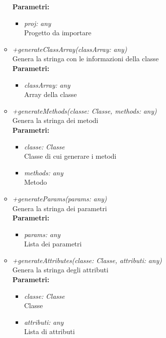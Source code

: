 \begin{itemize}
\begin{itemize}
    		\textbf{Parametri:}
    		\begin{itemize}
    			\item \emph{proj: any}\\
    			Progetto da importare
    		\end{itemize}
    		\item \emph{+generateClassArray(classArray: any)}\\
    		Genera la stringa con le informazioni della classe\\
    		\textbf{Parametri:}
    		\begin{itemize}
    			\item \emph{classArray: any}\\
    			Array della classe
    		\end{itemize}
    		\item \emph{+generateMethods(classe: Classe, methods: any)}\\
    		Genera la stringa dei metodi\\
    		\textbf{Parametri:}
    		\begin{itemize}
    			\item \emph{classe: Classe}\\
    			Classe di cui generare i metodi
    			\item \emph{methods: any}\\
    			Metodo
    		\end{itemize}
    		\item \emph{+generateParams(params: any)}\\
    		Genera la stringa dei parametri\\
    		\textbf{Parametri:}
    		\begin{itemize}
    			\item \emph{params: any}\\
    			Lista dei parametri
    		\end{itemize}
    		\item \emph{+generateAttributes(classe: Classe, attributi: any)}\\
    		Genera la stringa degli attributi\\
    		\textbf{Parametri:}
    		\begin{itemize}
    			\item \emph{classe: Classe}\\
    			Classe
    			\item \emph{attributi: any}\\
    			Lista di attributi
    		\end{itemize}

\end{itemize}
\end{itemize}
